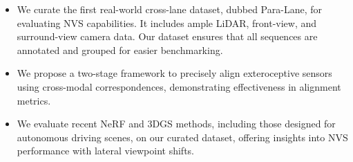 \begin{itemize}
\item We curate the first real-world cross-lane dataset, dubbed Para-Lane, for evaluating NVS capabilities. It includes ample LiDAR, front-view, and surround-view camera data. Our dataset ensures that all sequences are annotated and grouped for easier benchmarking.
\item We propose a two-stage framework to precisely align exteroceptive sensors using cross-modal correspondences, demonstrating effectiveness in alignment metrics.
\item We evaluate recent NeRF and 3DGS methods, including those designed for autonomous driving scenes, on our curated dataset, offering insights into NVS performance with lateral viewpoint shifts.

\end{itemize}

